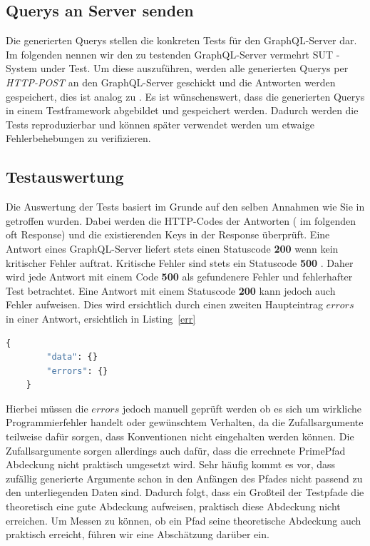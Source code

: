 \subsection{Querys an Server senden}
\label{testf}

Die generierten Querys stellen die konkreten Tests für den GraphQL-Server dar.
Im folgenden nennen wir den zu testenden GraphQL-Server vermehrt SUT - System under Test.
Um diese auszuführen, werden alle generierten Querys per \textit{HTTP-POST} an den GraphQL-Server geschickt und die Antworten
werden gespeichert, dies ist analog zu \cite{property-based-testing}.
Es ist wünschenswert, dass die generierten Querys in einem Testframework abgebildet und gespeichert werden.
Dadurch werden die Tests reproduzierbar und können später verwendet werden um etwaige Fehlerbehebungen zu verifizieren.

\subsection{Testauswertung}

Die Auswertung der Tests basiert im Grunde auf den selben Annahmen wie Sie in \cite{property-based-testing} getroffen wurden.
Dabei werden die HTTP-Codes der Antworten ( im folgenden oft Response) und die existierenden Keys in der Response überprüft.
Eine Antwort eines GraphQL-Server liefert stets einen Statuscode \textbf{200} wenn kein kritischer Fehler auftrat.
Kritische Fehler sind stets ein Statuscode \textbf{500} \cite[vgl. 7. Response]{graphqlspecification}.
Daher wird jede Antwort mit einem Code \textbf{500} als gefundenere Fehler und fehlerhafter Test betrachtet.
Eine Antwort mit einem Statuscode \textbf{200} kann jedoch auch Fehler aufweisen.
Dies wird ersichtlich durch einen zweiten Haupteintrag $errors$ in einer Antwort, ersichtlich in Listing~\ref{err}

\begin{lstlisting}[language=GraphQL, label={err}, caption={fehlerhafte Antwort}]
    {
        "data": {}
        "errors": {}
    }
\end{lstlisting}

Hierbei müssen die $errors$ jedoch manuell geprüft werden ob es sich um wirkliche Programmierfehler handelt oder gewünschtem Verhalten,
da die Zufallsargumente teilweise dafür sorgen, dass Konventionen nicht eingehalten werden können.
Die Zufallsargumente sorgen allerdings auch dafür, dass die errechnete PrimePfad Abdeckung nicht praktisch umgesetzt wird.
Sehr häufig kommt es vor, dass zufällig generierte Argumente schon in den Anfängen des Pfades nicht passend zu den unterliegenden Daten sind.
Dadurch folgt, dass ein Großteil der Testpfade die theoretisch eine gute Abdeckung aufweisen, praktisch diese Abdeckung nicht erreichen.
Um Messen zu können, ob ein Pfad seine theoretische Abdeckung auch praktisch erreicht, führen wir eine Abschätzung darüber ein.

